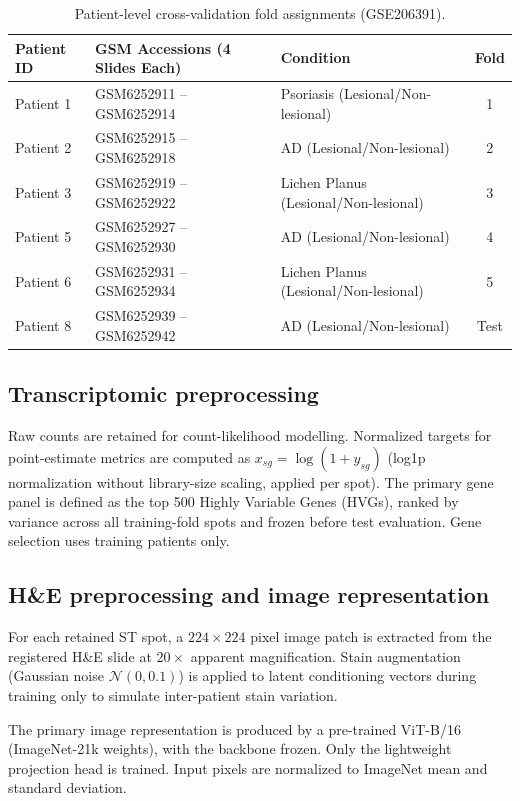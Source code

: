 \documentclass[nocrop]{bioinfo}
\begin{document}
\begin{table}[h]
\centering
\caption{Patient-level cross-validation fold assignments (GSE206391).}
\label{tab:splits}
\begin{tabular}{lllc}
\hline
\textbf{Patient ID} & \textbf{GSM Accessions (4 Slides Each)} & \textbf{Condition} & \textbf{Fold} \\
\hline
Patient 1 & GSM6252911 -- GSM6252914 & Psoriasis (Lesional/Non-lesional) & 1 \\
Patient 2 & GSM6252915 -- GSM6252918 & AD (Lesional/Non-lesional) & 2 \\
Patient 3 & GSM6252919 -- GSM6252922 & Lichen Planus (Lesional/Non-lesional) & 3 \\
Patient 5 & GSM6252927 -- GSM6252930 & AD (Lesional/Non-lesional) & 4 \\
Patient 6 & GSM6252931 -- GSM6252934 & Lichen Planus (Lesional/Non-lesional) & 5 \\
Patient 8 & GSM6252939 -- GSM6252942 & AD (Lesional/Non-lesional) & Test \\
\hline
\end{tabular}
\end{table}

\subsection{Transcriptomic preprocessing}

Raw counts are retained for count-likelihood modelling. Normalized targets for
point-estimate metrics are computed as $x_{sg} = \log(1 + y_{sg})$ (log1p
normalization without library-size scaling, applied per spot). The primary
gene panel is defined as the top 500 Highly Variable Genes (HVGs), ranked by
variance across all training-fold spots and frozen before test evaluation.
Gene selection uses training patients only.

\subsection{H\&E preprocessing and image representation}

For each retained ST spot, a $224 \times 224$ pixel image patch is extracted from the registered H\&E slide at $20\times$ apparent magnification. Stain augmentation (Gaussian noise $\mathcal{N}(0, 0.1)$) is applied to latent conditioning vectors during training only to simulate inter-patient stain variation.

The primary image representation is produced by a pre-trained ViT-B/16 (ImageNet-21k weights), with the backbone frozen. Only the lightweight projection head is trained. Input pixels are normalized to ImageNet mean and standard deviation.
\end{document}
